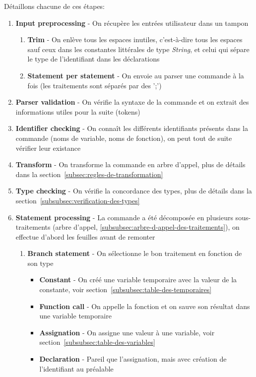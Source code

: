 \documentclass[french]{article}
\begin{document}
			Détaillons chacune de ces étapes:
			\begin{enumerate}
				\item \textbf{Input preprocessing} - On récupère les entrées utilisateur dans un tampon 
				\begin{enumerate}
					\item \textbf{Trim} - On enlève tous les espaces inutiles, c'est-à-dire tous les espaces sauf ceux dans les constantes littérales de type \textit{String}, et celui qui sépare le type de l'identifiant dans les déclarations
					\item \textbf{Statement per statement} - On envoie au parser une commande à la fois (les traitements sont séparés par des ';') 
				\end{enumerate}
				\item \textbf{Parser validation} - On vérifie la syntaxe de la commande et on extrait des informations utiles pour la suite (tokens)
				\item \textbf{Identifier checking} - On connaît les différents identifiants présents dans la commande (noms de variable, noms de fonction), on peut tout de suite vérifier leur existance 
				\item \textbf{Transform} - On transforme la commande en arbre d'appel, plus de détails dans la section~\ref{subsec:regles-de-transformation}
				\item \textbf{Type checking} - On vérifie la concordance des types, plus de détails dans la section~\ref{subsubsec:verification-des-types}
				\item \textbf{Statement processing} - La commande a été décomposée en plusieurs sous-traitements (arbre d'appel, \ref{subsubsec:arbre-d-appel-des-traitements}), on effectue d'abord les feuilles avant de remonter
				\begin{enumerate}
					\item \textbf{Branch statement} - On sélectionne le bon traitement en fonction de son type
					\begin{itemize}
						\item \textbf{Constant} - On créé une variable temporaire avec la valeur de la constante, voir section~\ref{subsubsec:table-des-temporaires}
						\item \textbf{Function call} - On appelle la fonction et on sauve son résultat dans une variable temporaire
						\item \textbf{Assignation} - On assigne une valeur à une variable, voir section~\ref{subsubsec:table-des-variables}
						\item \textbf{Declaration} - Pareil que l'assignation, mais avec création de l'identifiant au préalable 

\end{itemize}
\end{enumerate}
\end{enumerate}
\end{document}
